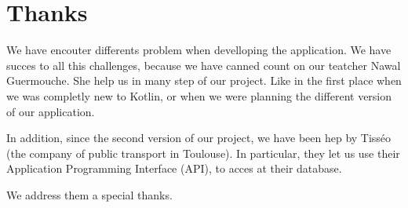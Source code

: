 \section*{Thanks}

We have encouter differents problem when develloping the application. We have succes to all this challenges, because we have canned count on our teatcher Nawal Guermouche. She help us in many step of our project. Like in the first place when we was completly new to Kotlin, or when we were planning the different version of our application.


In addition, since the second version of our project, we have been hep by Tisséo (the company of public transport in Toulouse). In particular, they let us use their Application Programming Interface (API)\cite{tisseo}, to acces at their database.


We address them a special thanks.
